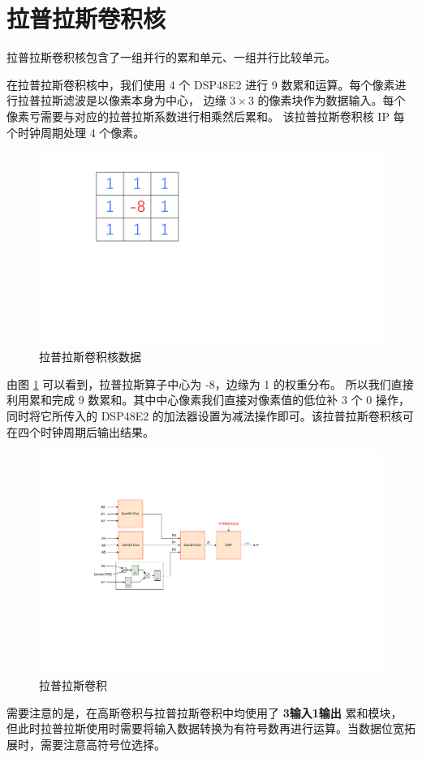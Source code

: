 \documentclass[12pt, a4paper, oneside]{ctexbook}
\begin{document}
	\section{拉普拉斯卷积核}
	拉普拉斯卷积核包含了一组并行的累和单元、一组并行比较单元。\par
	在拉普拉斯卷积核中，我们使用 4 个 DSP48E2 进行 9 数累和运算。每个像素进行拉普拉斯滤波是以像素本身为中心，
	边缘 $3\times3$ 的像素块作为数据输入。每个像素亏需要与对应的拉普拉斯系数进行相乘然后累和。
	该拉普拉斯卷积核 IP 每个时钟周期处理 4 个像素。\par
	\begin{figure}[h]
		\centering
		\includegraphics[scale=0.4]{pic/number_3}
		\caption{拉普拉斯卷积核数据}
		\label{fig:number3}
	\end{figure}
	由图 \ref{fig:number3} 可以看到，拉普拉斯算子中心为 -8，边缘为 1 的权重分布。
	所以我们直接利用累和完成 9 数累和。其中中心像素我们直接对像素值的低位补 3 个 0 操作，
	同时将它所传入的 DSP48E2 的加法器设置为减法操作即可。该拉普拉斯卷积核可在四个时钟周期后输出结果。\par
	\begin{figure}[h]	
	\centering
	\includegraphics[scale=0.7]{pic/laplace.pdf}
	\caption{拉普拉斯卷积}
	\label{laplace}
	\end{figure}	
	需要注意的是，在高斯卷积与拉普拉斯卷积中均使用了 \textbf{3输入1输出} 累和模块，
	但此时拉普拉斯使用时需要将输入数据转换为有符号数再进行运算。当数据位宽拓展时，需要注意高符号位选择。
	
\end{document}
